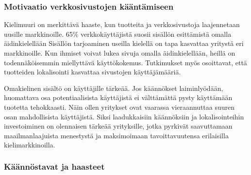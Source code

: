\documentclass[11pt,a4paper,titlepage,oneside]{article}
\begin{document}


\subsubsection{Motivaatio verkkosivustojen kääntämiseen}










Kielimuuri on merkittävä haaste, kun tuotteita ja verkkosivustoja laajennetaan uusille markkinoille.
65\% verkkokäyttäjistä suosii sisällön esittämistä omalla äidinkielellään
Sisällön tarjoaminen useilla kielellä on tapa kasvattaa yritystä eri markkinoille. 
Kun ihmiset voivat lukea sivuja omalla äidinkielellään, heillä on todennäköisemmin miellyttävä käyttökokemus.
Tutkimukset myös osoittavat, että tuotteiden lokalisointi kasvattaa sivustojen käyttäjämääriä.
\medskip



Omakielinen sisältö on käyttäjille tärkeää.
Jos käännökset laiminlyödään, huomattava osa potentiaalisista käyttäjistä ei välttämättä pysty käyttämään tuotetta tehokkaasti.
Näin ollen yritykset ovat vaarassa vieraannuttaa suuren osan mahdollisista käyttäjistä.
% 
Siksi laadukkaisiin käännöksiin ja lokalisointeihin investoiminen on olennaisen tärkeää yrityksille,
jotka pyrkivät saavuttamaan maailmanlaajuista menestystä ja maksimoimaan tavoittavuutensa erilaisilla kielimarkkinoilla.
\medskip %









\subsubsection{Käännöstavat ja haasteet}
\end{document}
